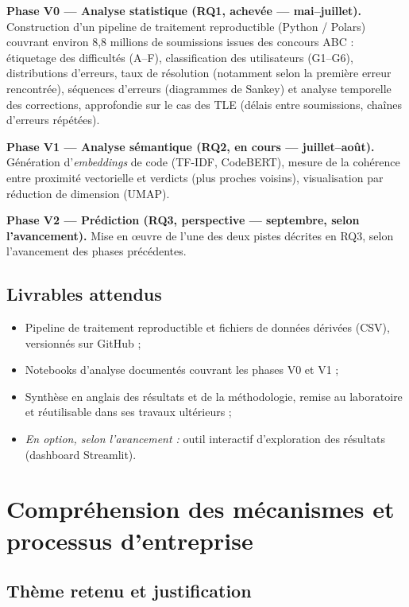 \documentclass[11pt, a4paper]{article}
\begin{document}
\textbf{Phase V0 --- Analyse statistique (RQ1, achevée --- mai--juillet).}
Construction d'un pipeline de traitement reproductible (Python / Polars)
couvrant environ 8,8 millions de soumissions issues des concours ABC : étiquetage des difficultés
(A--F), classification des utilisateurs (G1--G6), distributions d'erreurs,
taux de résolution (notamment selon la première erreur rencontrée), séquences
d'erreurs (diagrammes de Sankey) et analyse temporelle des corrections,
approfondie sur le cas des TLE (délais entre soumissions, chaînes d'erreurs
répétées).

\textbf{Phase V1 --- Analyse sémantique (RQ2, en cours --- juillet--août).} Génération
d'\textit{embeddings} de code (TF-IDF, CodeBERT), mesure de la cohérence entre
proximité vectorielle et verdicts (plus proches voisins), visualisation par
réduction de dimension (UMAP).

\textbf{Phase V2 --- Prédiction (RQ3, perspective --- septembre, selon l'avancement).} Mise en œuvre de l'une des deux pistes décrites en RQ3, selon l'avancement des phases précédentes.

\subsection{Livrables attendus}

\begin{itemize}
  \item Pipeline de traitement reproductible et fichiers de données dérivées
        (CSV), versionnés sur GitHub ;
  \item Notebooks d'analyse documentés couvrant les phases V0 et V1 ;
  \item Synthèse en anglais des résultats et de la méthodologie, remise au
        laboratoire et réutilisable dans ses travaux ultérieurs ;
  \item \textit{En option, selon l'avancement :} outil interactif
        d'exploration des résultats (dashboard Streamlit).
\end{itemize}

\section{Compréhension des mécanismes et processus d'entreprise}

\subsection{Thème retenu et justification}
\end{document}
